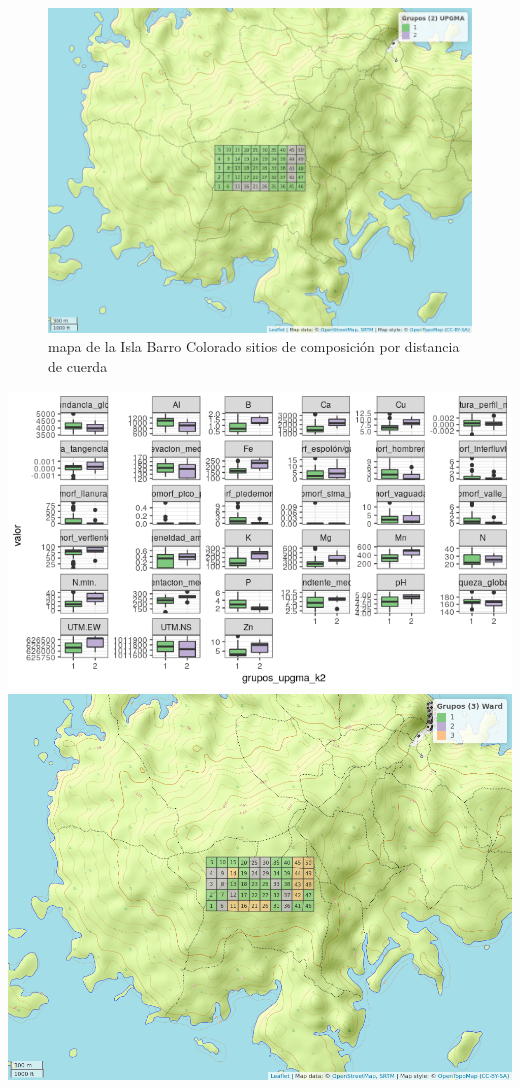 \documentclass[11pt,]{article}
\begin{document}
\begin{figure}
\centering
\includegraphics[width=1.00000\textwidth]{mapa_upgma_k2.png}
\caption{mapa de la Isla Barro Colorado sitios de composición por
distancia de cuerda \label{fig:bci_map}}
\end{figure}

\includegraphics[width=1.00000\textwidth]{mapas_variables_ambientales.png}
\includegraphics[width=1.00000\textwidth]{mapa_ward_k3.png}
\end{document}
